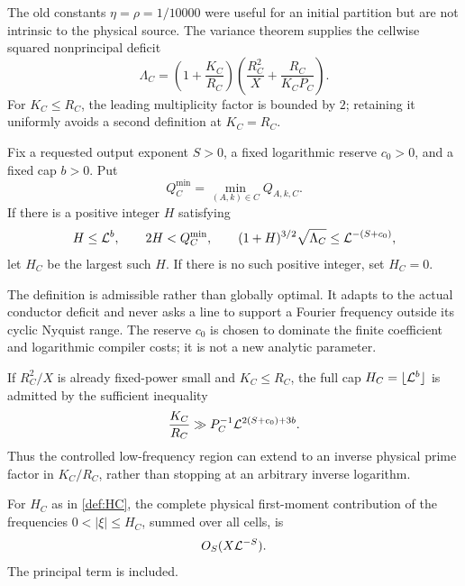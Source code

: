 The old constants $\eta=\rho=1/10000$ were useful for an initial partition but
are not intrinsic to the physical source.  The variance theorem supplies the
cellwise squared nonprincipal deficit
\begin{equation}\label{eq:LambdaC}
 \Lambda_C=
 \left(1+\frac{K_C}{R_C}\right)
 \left(\frac{R_C^2}{X}+\frac{R_C}{K_CP_C}\right).
\end{equation}
For $K_C\le R_C$, the leading multiplicity factor is bounded by $2$; retaining
it uniformly avoids a second definition at $K_C=R_C$.

\begin{definition}\label{def:HC}
Fix a requested output exponent $S>0$, a fixed logarithmic reserve $c_0>0$,
and a fixed cap $b>0$.  Put
\begin{equation}\label{eq:Qmin}
            Q_C^{\min}=\min_{(A,k)\in C}Q_{A,k,C}.
\end{equation}
If there is a positive integer $H$ satisfying
\begin{equation}\label{eq:HC-conditions}
 H\le\mathcal L^b,
 \qquad 2H<Q_C^{\min},
 \qquad
 (1+H)^{3/2}\sqrt{\Lambda_C}\le\mathcal L^{-(S+c_0)},
\end{equation}
let $H_C$ be the largest such $H$.  If there is no such positive integer, set
$H_C=0$.
\end{definition}

The definition is admissible rather than globally optimal.  It adapts to the
actual conductor deficit and never asks a line to support a Fourier frequency
outside its cyclic Nyquist range.  The reserve $c_0$ is chosen to dominate the
finite coefficient and logarithmic compiler costs; it is not a new analytic
parameter.

If $R_C^2/X$ is already fixed-power small and $K_C\le R_C$, the full cap
$H_C=\lfloor\mathcal L^b\rfloor$ is admitted by the sufficient inequality
\begin{equation}\label{eq:full-cap-condition}
          \frac{K_C}{R_C}
          \gg P_C^{-1}\mathcal L^{2(S+c_0)+3b}.
\end{equation}
Thus the controlled low-frequency region can extend to an inverse physical
prime factor in $K_C/R_C$, rather than stopping at an arbitrary inverse
logarithm.

\begin{proposition}\label{prop:adaptive-low}
For $H_C$ as in \cref{def:HC}, the complete physical first-moment contribution
of the frequencies $0<|\xi|\le H_C$, summed over all cells, is
\begin{equation}\label{eq:adaptive-low-bound}
                        O_S(X\mathcal L^{-S}).
\end{equation}
The principal term is included.
\end{proposition}

